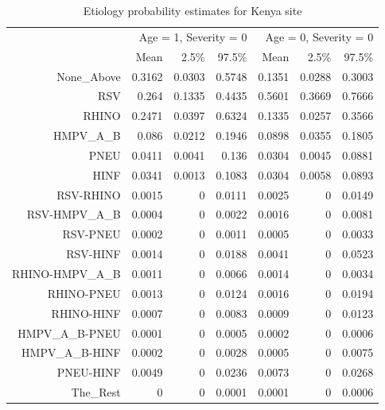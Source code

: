 \documentclass[11 pt, a4paper]{article}  %
\begin{document}
\begin{table}[htbp]
\centering
\caption{Etiology probability estimates for Kenya site}
\label{tab:kenya1}
\begin{tabular}{rrrrrrr}
\hline
                 & \multicolumn{3}{r}{Age = 1, Severity = 0} & \multicolumn{3}{r}{Age = 0, Severity = 0} \\
                 & Mean         & 2.5\%        & 97.5\%      & Mean         & 2.5\%        & 97.5\%      \\ \hline
None\_Above      & 0.3162       & 0.0303       & 0.5748      & 0.1351       & 0.0288       & 0.3003      \\
RSV              & 0.264        & 0.1335       & 0.4435      & 0.5601       & 0.3669       & 0.7666      \\
RHINO            & 0.2471       & 0.0397       & 0.6324      & 0.1335       & 0.0257       & 0.3566      \\
HMPV\_A\_B       & 0.086        & 0.0212       & 0.1946      & 0.0898       & 0.0355       & 0.1805      \\
PNEU             & 0.0411       & 0.0041       & 0.136       & 0.0304       & 0.0045       & 0.0881      \\
HINF             & 0.0341       & 0.0013       & 0.1083      & 0.0304       & 0.0058       & 0.0893      \\
RSV-RHINO        & 0.0015       & 0            & 0.0111      & 0.0025       & 0            & 0.0149      \\
RSV-HMPV\_A\_B   & 0.0004       & 0            & 0.0022      & 0.0016       & 0            & 0.0081      \\
RSV-PNEU         & 0.0002       & 0            & 0.0011      & 0.0005       & 0            & 0.0033      \\
RSV-HINF         & 0.0014       & 0            & 0.0188      & 0.0041       & 0            & 0.0523      \\
RHINO-HMPV\_A\_B & 0.0011       & 0            & 0.0066      & 0.0014       & 0            & 0.0034      \\
RHINO-PNEU       & 0.0013       & 0            & 0.0124      & 0.0016       & 0            & 0.0194      \\
RHINO-HINF       & 0.0007       & 0            & 0.0083      & 0.0009       & 0            & 0.0123      \\
HMPV\_A\_B-PNEU  & 0.0001       & 0            & 0.0005      & 0.0002       & 0            & 0.0006      \\
HMPV\_A\_B-HINF  & 0.0002       & 0            & 0.0028      & 0.0005       & 0            & 0.0075      \\
PNEU-HINF        & 0.0049       & 0            & 0.0236      & 0.0073       & 0            & 0.0268      \\
The\_Rest        & 0            & 0            & 0.0001      & 0.0001       & 0            & 0.0006      \\ \hline
\end{tabular}
\end{table}
\end{document}
